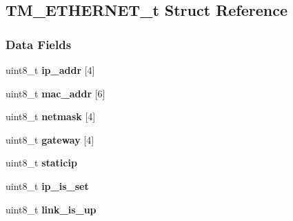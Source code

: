 \hypertarget{struct_t_m___e_t_h_e_r_n_e_t__t}{}\subsection{T\+M\+\_\+\+E\+T\+H\+E\+R\+N\+E\+T\+\_\+t Struct Reference}
\label{struct_t_m___e_t_h_e_r_n_e_t__t}
\subsubsection*{Data Fields}
\begin{DoxyCompactItemize}
\item 
\hypertarget{struct_t_m___e_t_h_e_r_n_e_t__t_a43d041f66a68d7de2411f35f23ee2d97}{}uint8\+\_\+t {\bfseries ip\+\_\+addr} \mbox{[}4\mbox{]}\label{struct_t_m___e_t_h_e_r_n_e_t__t_a43d041f66a68d7de2411f35f23ee2d97}

\item 
\hypertarget{struct_t_m___e_t_h_e_r_n_e_t__t_a6ebc8ec06b7e6d8e4bf58018c643cbca}{}uint8\+\_\+t {\bfseries mac\+\_\+addr} \mbox{[}6\mbox{]}\label{struct_t_m___e_t_h_e_r_n_e_t__t_a6ebc8ec06b7e6d8e4bf58018c643cbca}

\item 
\hypertarget{struct_t_m___e_t_h_e_r_n_e_t__t_a58486b38b1780e15a69ebbc677916683}{}uint8\+\_\+t {\bfseries netmask} \mbox{[}4\mbox{]}\label{struct_t_m___e_t_h_e_r_n_e_t__t_a58486b38b1780e15a69ebbc677916683}

\item 
\hypertarget{struct_t_m___e_t_h_e_r_n_e_t__t_a0beca1eecd2529c061a6dc4cb8a412fd}{}uint8\+\_\+t {\bfseries gateway} \mbox{[}4\mbox{]}\label{struct_t_m___e_t_h_e_r_n_e_t__t_a0beca1eecd2529c061a6dc4cb8a412fd}

\item 
\hypertarget{struct_t_m___e_t_h_e_r_n_e_t__t_afcfe8a1aa47b04492b06cdedbd0b8872}{}uint8\+\_\+t {\bfseries staticip}\label{struct_t_m___e_t_h_e_r_n_e_t__t_afcfe8a1aa47b04492b06cdedbd0b8872}

\item 
\hypertarget{struct_t_m___e_t_h_e_r_n_e_t__t_a9e3b1fa2c9b6d7c83d6148522ee3e716}{}uint8\+\_\+t {\bfseries ip\+\_\+is\+\_\+set}\label{struct_t_m___e_t_h_e_r_n_e_t__t_a9e3b1fa2c9b6d7c83d6148522ee3e716}

\item 
\hypertarget{struct_t_m___e_t_h_e_r_n_e_t__t_aab2066e0f71986aff54b056951cb283c}{}uint8\+\_\+t {\bfseries link\+\_\+is\+\_\+up}\label{struct_t_m___e_t_h_e_r_n_e_t__t_aab2066e0f71986aff54b056951cb283c}


\end{DoxyCompactItemize}
